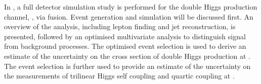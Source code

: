 In , a full \CLICILD detector simulation study is performed for the double Higgs production channel, \eeToHH, via \WW fusion. Event generation and simulation will be discussed first. An overview of the analysis, including lepton finding and jet reconstruction, is presented, followed by an optimised multivariate analysis to distinguish signal from background processes. The optimised event selection is used to derive an estimate of the uncertainty on the cross section of double Higgs production at \CLIC. The event selection is further used to provide an estimate of the uncertainty on the measurements of  trilinear Higgs self coupling and quartic coupling at \CLIC.

